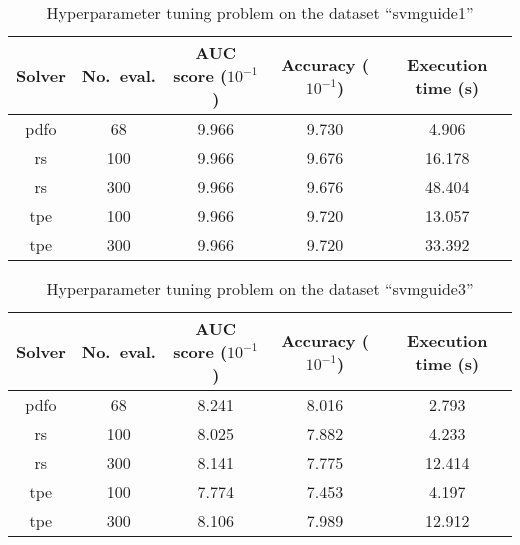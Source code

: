 \begin{table}[!ht]
    \caption{Hyperparameter tuning problem on the dataset \enquote{svmguide1}}
    \label{tab:svmguide1}
    \centering
    \begin{tabular}{cS[table-parse-only]SSS}
        \toprule
        Solver      & {No.\ eval.}  & {AUC score ($10^{-1}$)}   & {Accuracy ($10^{-1}$)}    & {Execution time (\si{\second})}\\
        \midrule
        \gls{pdfo}  & 68            & 9.966                     & 9.730                     & 4.906\\
        \gls{rs}    & 100           & 9.966                     & 9.676                     & 16.178\\
        \gls{rs}    & 300           & 9.966                     & 9.676                     & 48.404\\
        \gls{tpe}   & 100           & 9.966                     & 9.720                     & 13.057\\
        \gls{tpe}   & 300           & 9.966                     & 9.720                     & 33.392\\
        \bottomrule
    \end{tabular}
\end{table}

\begin{table}[!ht]
    \caption{Hyperparameter tuning problem on the dataset \enquote{svmguide3}}
    \label{tab:svmguide3}
    \centering
    \begin{tabular}{cS[table-parse-only]SSS}
        \toprule
        Solver      & {No.\ eval.}  & {AUC score ($10^{-1}$)}   & {Accuracy ($10^{-1}$)}    & {Execution time (\si{\second})}\\
        \midrule
        \gls{pdfo}  & 68            & 8.241                     & 8.016                     & 2.793\\
        \gls{rs}    & 100           & 8.025                     & 7.882                     & 4.233\\
        \gls{rs}    & 300           & 8.141                     & 7.775                     & 12.414\\
        \gls{tpe}   & 100           & 7.774                     & 7.453                     & 4.197\\
        \gls{tpe}   & 300           & 8.106                     & 7.989                     & 12.912\\
        \bottomrule
    \end{tabular}
\end{table}

